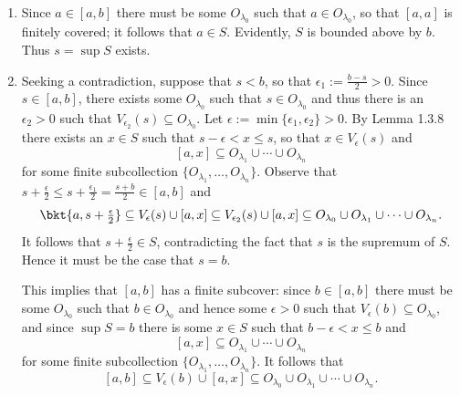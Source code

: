 \documentclass{lew98_solutions}
\begin{document}
\begin{solution}
    \begin{enumerate}
        \item Since \( a \in [a, b] \) there must be some \( O_{\lambda_0} \) such that \( a \in O_{\lambda_0} \), so that \( [a, a] \) is finitely covered; it follows that \( a \in S \). Evidently, \( S \) is bounded above by \( b \). Thus \( s = \sup S \) exists.

        \item Seeking a contradiction, suppose that \( s < b \), so that \( \epsilon_1 := \tfrac{b - s}{2} > 0 \). Since \( s \in [a, b] \), there exists some \( O_{\lambda_0} \) such that \( s \in O_{\lambda_0} \) and thus there is an \( \epsilon_2 > 0 \) such that \( V_{\epsilon_2}(s) \subseteq O_{\lambda_0} \). Let \( \epsilon := \min \{ \epsilon_1, \epsilon_2 \} > 0 \). By Lemma 1.3.8 there exists an \( x \in S \) such that \( s - \epsilon < x \leq s \), so that \( x \in V_{\epsilon}(s) \) and
        \[
            [a, x] \subseteq O_{\lambda_1} \cup \cdots \cup O_{\lambda_n}
        \]
        for some finite subcollection \( \{ O_{\lambda_1}, \ldots, O_{\lambda_n} \} \). Observe that \( s + \tfrac{\epsilon}{2} \leq s + \tfrac{\epsilon_1}{2} = \tfrac{s + b}{2} \in [a, b] \) and
        \[
            \bkt{ a, s + \tfrac{\epsilon}{2} } \subseteq V_{\epsilon}(s) \cup [a, x] \subseteq V_{\epsilon_2}(s) \cup [a, x] \subseteq O_{\lambda_0} \cup O_{\lambda_1} \cup \cdots \cup O_{\lambda_n}.
        \]
        It follows that \( s + \tfrac{\epsilon}{2} \in S \), contradicting the fact that \( s \) is the supremum of \( S \). Hence it must be the case that \( s = b \).

        This implies that \( [a, b] \) has a finite subcover: since \( b \in [a, b] \) there must be some \( O_{\lambda_0} \) such that \( b \in O_{\lambda_0} \) and hence some \( \epsilon > 0 \) such that \( V_{\epsilon}(b) \subseteq O_{\lambda_0} \), and since \( \sup S = b \) there is some \( x \in S \) such that \( b - \epsilon < x \leq b \) and
        \[
            [a, x] \subseteq O_{\lambda_1} \cup \cdots \cup O_{\lambda_n}
        \]
        for some finite subcollection \( \{ O_{\lambda_1}, \ldots, O_{\lambda_n} \} \). It follows that
        \[
            [a, b] \subseteq V_{\epsilon}(b) \cup [a, x] \subseteq O_{\lambda_0} \cup O_{\lambda_1} \cup \cdots \cup O_{\lambda_n}.
        \]


\end{enumerate}
\end{solution}
\end{document}
